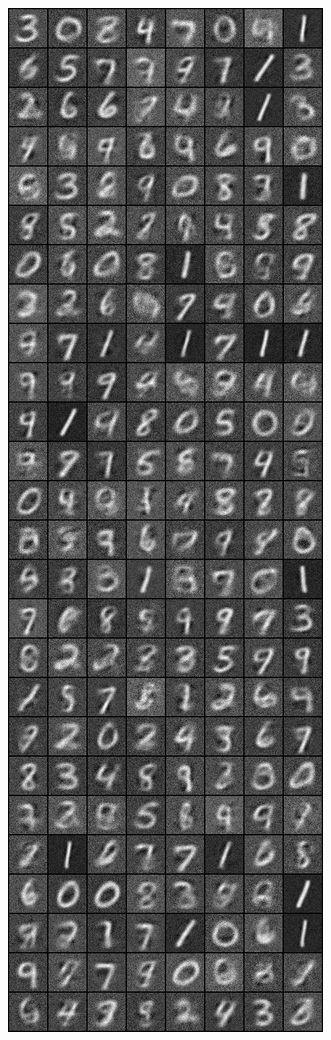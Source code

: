 \begin{figure}
\includegraphics[width=\picwidth\columnwidth]{figures/supplementary/mnist/image_5000.png}

\end{figure}
